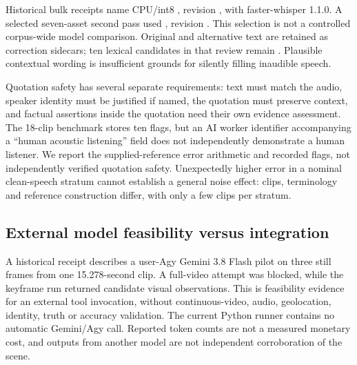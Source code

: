 Historical bulk receipts name CPU/int8 , revision , with faster-whisper 1.1.0. A selected seven-asset second pass used , revision . This selection is not a controlled corpus-wide model comparison. Original and alternative text are retained as correction sidecars; ten lexical candidates in that review remain . Plausible contextual wording is insufficient grounds for silently filling inaudible speech.

Quotation safety has several separate requirements: text must match the audio, speaker identity must be justified if named, the quotation must preserve context, and factual assertions inside the quotation need their own evidence assessment. The 18-clip benchmark stores ten  flags, but an AI worker identifier accompanying a ``human acoustic listening'' field does not independently demonstrate a human listener. We report the supplied-reference error arithmetic and recorded flags, not independently verified quotation safety. Unexpectedly higher error in a nominal clean-speech stratum cannot establish a general noise effect: clips, terminology and reference construction differ, with only a few clips per stratum.

\subsection{External model feasibility versus integration}
A historical receipt describes a user-Agy Gemini 3.8 Flash pilot on three still frames from one 15.278-second clip. A full-video attempt was blocked, while the keyframe run returned candidate visual observations. This is feasibility evidence for an external tool invocation, without continuous-video, audio, geolocation, identity, truth or accuracy validation. The current Python runner contains no automatic Gemini/Agy call. Reported token counts are not a measured monetary cost, and outputs from another model are not independent corroboration of the scene.
